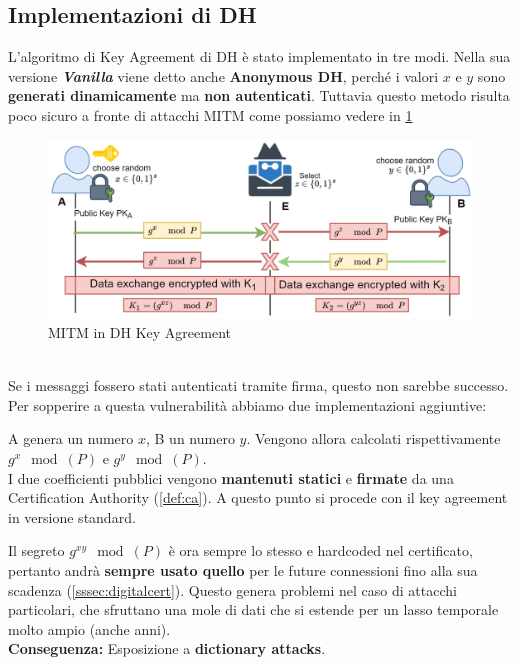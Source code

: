 \subsection{Implementazioni di DH}
L'algoritmo di Key Agreement di DH è stato implementato in tre modi. Nella sua versione \textit{\textbf{Vanilla}} viene detto anche \textbf{Anonymous DH}, perché i valori $x$ e $y$ sono \textbf{generati dinamicamente} ma \textbf{non autenticati}. Tuttavia questo metodo risulta poco sicuro a fronte di attacchi MITM come possiamo vedere in \cref{fig:mitmdh}
\begin{figure}[ht]
    \centering
    \includegraphics{image/mitmdh.png}
    \caption{MITM in DH Key Agreement}
    \label{fig:mitmdh}
\end{figure}\\
Se i messaggi fossero stati autenticati tramite firma, questo non sarebbe successo.
Per sopperire a questa vulnerabilità abbiamo due implementazioni aggiuntive: 
\begin{definition}[Fixed DH]\label{def:fixdh}
A genera un numero $x$, B un numero $y$. Vengono allora calcolati rispettivamente $g^x\mod(P)$ e $g^y\mod(P)$.\\
I due coefficienti pubblici vengono \textbf{mantenuti statici} e \textbf{firmate} da una Certification Authority (\cref{def:ca}). A questo punto si procede con il key agreement in versione standard.
\end{definition}
\begin{corollary}
Il segreto $g^{xy}\mod(P)$ è ora sempre lo stesso e hardcoded nel certificato, pertanto andrà \textbf{sempre usato quello} per le future connessioni fino alla sua scadenza (\cref{sssec:digitalcert}). Questo genera problemi nel caso di attacchi particolari, che sfruttano una mole di dati che si estende per un lasso temporale molto ampio (anche anni).\\
\textbf{Conseguenza:} Esposizione a \textbf{dictionary attacks}.
\end{corollary}

